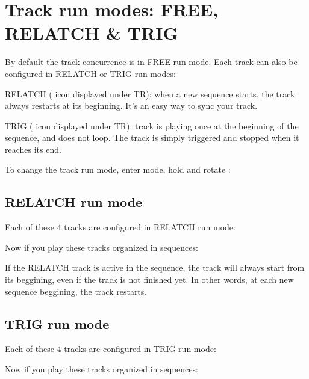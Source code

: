 \section{Track run modes: FREE, RELATCH \& TRIG}

By default the track concurrence is in FREE run mode. Each track can also be configured in RELATCH or TRIG run modes:

RELATCH ( icon displayed under TR): when a new sequence starts, the track always restarts at its beginning. It's an easy way to sync your track.

TRIG ( icon displayed under TR): track is playing once at the beginning of the sequence, and does not loop. The track is simply triggered and stopped when it reaches its end.

To change the track run mode, enter  mode, hold  and rotate \encodericon{}:




\subsection{RELATCH run mode}

Each of these 4 tracks are configured in RELATCH run mode:


Now if you play these tracks organized in sequences:


If the RELATCH track is active in the sequence, the track will always start from its beggining, even if the track is not finished yet. In other words, at each new sequence beggining, the track restarts.


\subsection{TRIG run mode}

Each of these 4 tracks are configured in TRIG run mode:


Now if you play these tracks organized in sequences:


